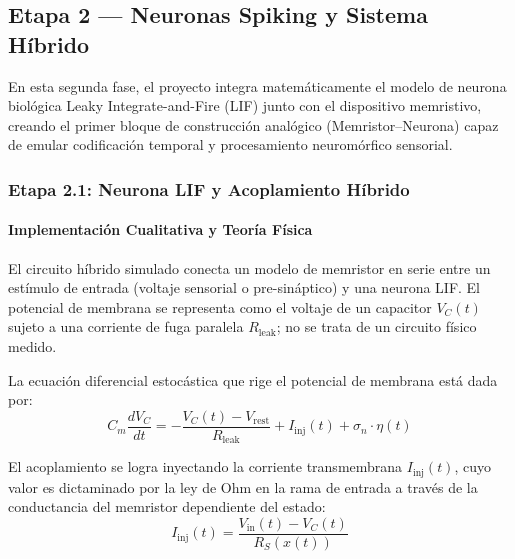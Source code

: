 
\subsection{Etapa 2 --- Neuronas Spiking y Sistema Híbrido}
\label{ch:fase2}

En esta segunda fase, el proyecto integra matemáticamente el modelo de neurona biológica Leaky Integrate-and-Fire (LIF) junto con el dispositivo memristivo, creando el primer bloque de construcción analógico (Memristor--Neurona) capaz de emular codificación temporal y procesamiento neuromórfico sensorial.

\subsubsection{Etapa 2.1: Neurona LIF y Acoplamiento Híbrido}
\label{sec:etapa2_1}

\paragraph{Implementación Cualitativa y Teoría Física}
El circuito híbrido simulado conecta un modelo de memristor en serie entre un estímulo de entrada (voltaje sensorial o pre-sináptico) y una neurona LIF. El potencial de membrana se representa como el voltaje de un capacitor $V_C(t)$ sujeto a una corriente de fuga paralela $R_{\mathrm{leak}}$; no se trata de un circuito físico medido.

La ecuación diferencial estocástica que rige el potencial de membrana está dada por:
\begin{equation}
C_m \frac{dV_C}{dt} = -\frac{V_C(t) - V_{\mathrm{rest}}}{R_{\mathrm{leak}}} + I_{\mathrm{inj}}(t) + \sigma_n \cdot \eta(t)
\label{eq:lif_hibrida}
\end{equation}

El acoplamiento se logra inyectando la corriente transmembrana $I_{\mathrm{inj}}(t)$, cuyo valor es dictaminado por la ley de Ohm en la rama de entrada a través de la conductancia del memristor dependiente del estado:
\begin{equation}
I_{\mathrm{inj}}(t) = \frac{V_{\mathrm{in}}(t) - V_C(t)}{R_S(x(t))}
\label{eq:i_inyectada}
\end{equation}

